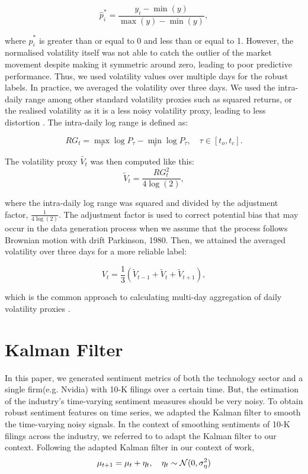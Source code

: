 \documentclass[logo,bsc,singlespacing,parskip]{infthesis}
\begin{document}
\begin{equation} \label{4.10}
\hat{p}_i^* = \frac{y_i - \min(y)}{\max(y) - \min(y)},
\end{equation}

where $\hat{p}_i^*$ is greater than or equal to 0 and less than or equal to 1. However, the normalised volatility itself was not able to catch the outlier of the market movement despite making it symmetric around zero, leading to poor predictive performance. Thus, we used volatility values over multiple days for the robust labels. In practice, we averaged the volatility over three days. We used the intra-daily range among other standard volatility proxies such as squared returns, or the realised volatility as it is a less noisy volatility proxy, leading to less distortion \cite{alizadeh2002range, patton2011volatility}. The intra-daily log range is defined as:

\begin{equation} \label{4.11}
RG_t = \max_{\tau} \log P_{\tau} - \min_{\tau} \log P_{\tau}, \quad \tau \in [t_o,t_c].
\end{equation}

The volatility proxy $\tilde{V_t}$ was then computed like this:
\begin{equation} \label{4.12}
\tilde{V}_t = \frac{RG_t^2}{4\log(2)},
\end{equation}

where the intra-daily log range was squared and divided by the adjustment factor, $\frac{1}{4\log(2)}$. The adjustment factor is used to correct potential bias that may occur in the data generation process when we assume that the process follows Brownian motion with drift Parkinson, 1980. Then, we attained the averaged volatility over three days for a more reliable label:

\begin{equation} \label{4.13}
V_t = \frac{1}{3} \left( \tilde{V}_{t-1} + \tilde{V}_t + \tilde{V}_{t+1} \right),
\end{equation}

which is the common approach to calculating multi-day aggregation of daily volatility proxies \cite{corsi2009simple}.

\section{Kalman Filter}
\label{sec:kalman_filter}

In this paper, we generated sentiment metrics of both the technology sector and a single firm(e.g. Nvidia) with 10-K filings over a certain time. But, the estimation of the industry’s time-varying sentiment measures should be very noisy. To obtain robust sentiment features on time series, we adapted the Kalman filter to smooth the time-varying noisy signals. In the context of smoothing sentiments of 10-K filings across the industry, we referred to \cite{borovkova2017sector} to adapt the Kalman filter to our context. Following the adapted Kalman filter in our context of work, 
\begin{equation} \label{4.14}
\\\mu_{t+1} = \mu_t + \eta_t, \quad \eta_t \sim \mathcal{N}(0, \sigma_{\eta}^2)
\end{equation}
\end{document}
